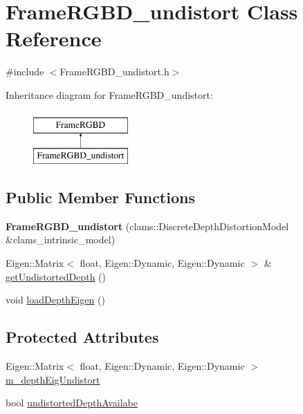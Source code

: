 \hypertarget{classFrameRGBD__undistort}{\section{\-Frame\-R\-G\-B\-D\-\_\-undistort \-Class \-Reference}
\label{classFrameRGBD__undistort}
}


{\ttfamily \#include $<$\-Frame\-R\-G\-B\-D\-\_\-undistort.\-h$>$}

\-Inheritance diagram for \-Frame\-R\-G\-B\-D\-\_\-undistort\-:\begin{figure}[H]
\begin{center}
\leavevmode
\includegraphics[height=2.000000cm]{classFrameRGBD__undistort}
\end{center}
\end{figure}
\subsection*{\-Public \-Member \-Functions}
\begin{DoxyCompactItemize}
\item 
\hypertarget{classFrameRGBD__undistort_ad6ac61f5e654bce423bba4996d7cda45}{{\bfseries \-Frame\-R\-G\-B\-D\-\_\-undistort} (clams\-::\-Discrete\-Depth\-Distortion\-Model \&clams\-\_\-intrinsic\-\_\-model)}\label{classFrameRGBD__undistort_ad6ac61f5e654bce423bba4996d7cda45}

\item 
\-Eigen\-::\-Matrix$<$ float, \*
\-Eigen\-::\-Dynamic, \-Eigen\-::\-Dynamic $>$ \& \hyperlink{classFrameRGBD__undistort_a30768340f9cb176ec60df772666839d2}{get\-Undistorted\-Depth} ()
\item 
void \hyperlink{classFrameRGBD__undistort_a2c657129ef9f883a08a937953e49f1a4}{load\-Depth\-Eigen} ()
\end{DoxyCompactItemize}
\subsection*{\-Protected \-Attributes}
\begin{DoxyCompactItemize}
\item 
\-Eigen\-::\-Matrix$<$ float, \*
\-Eigen\-::\-Dynamic, \-Eigen\-::\-Dynamic $>$ \hyperlink{classFrameRGBD__undistort_af87ec780215ec12243e54e9a6936c086}{m\-\_\-depth\-Eig\-Undistort}
\item 
bool \hyperlink{classFrameRGBD__undistort_a82a7a6bc0ee7691fc576b41d5e99f0d8}{undistorted\-Depth\-Availabe}
\end{DoxyCompactItemize}



